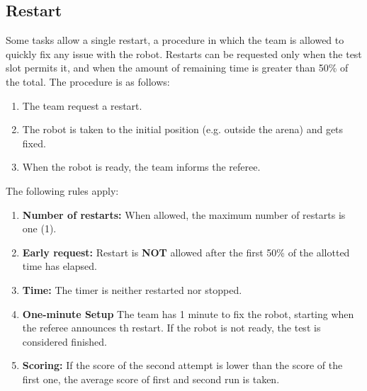 \subsection{Restart}
\label{rule:restart}
Some tasks allow a single restart, a procedure in which the team is allowed to quickly fix any issue with the robot.
Restarts can be requested only when the test slot permits it, and when the amount of remaining time is greater than 50\% of the total.
The procedure is as follows:

\begin{enumerate}
	\item The team request a restart.
	\item The robot is taken to the initial position (e.g. outside the arena) and gets fixed.
	\item When the robot is ready, the team informs the referee.
\end{enumerate}

The following rules apply:
\begin{enumerate}
	\item \textbf{Number of restarts:} When allowed, the maximum number of restarts is one (1).

	\item \textbf{Early request:} Restart is \textbf{NOT} allowed after the first 50\% of the allotted time has elapsed.

	\item \textbf{Time:} The timer is neither restarted nor stopped.

	\item \textbf{One-minute Setup} The team has 1 minute to fix the robot, starting when the referee announces th restart.
	If the robot is not ready, the test is considered finished.

	\item \textbf{Scoring:} If the score of the second attempt is lower than the score of the first one, the average score of first and second run is taken.
\end{enumerate}

